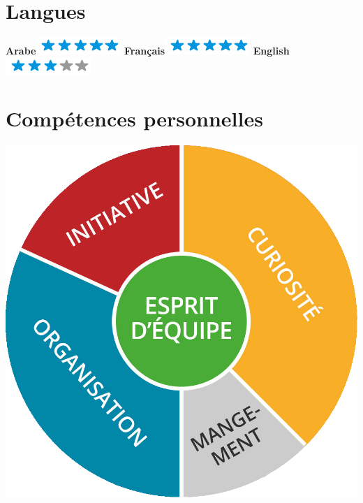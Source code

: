 \documentclass[]{friggeri-cv}
\begin{document}
\begin{aside}
~
~
~
  \section{Langues}
    \textbf{Arabe}\includegraphics[scale=0.40]{img/5stars.png}
    \textbf{Français}\includegraphics[scale=0.40]{img/5stars.png}
    \textbf{English}\includegraphics[scale=0.40]{img/3stars.png}
    ~
    ~
    ~
  \section{Compétences personnelles}
    \includegraphics[scale=0.1]{img/personnel.png}
    ~
\end{aside}
\end{document}
